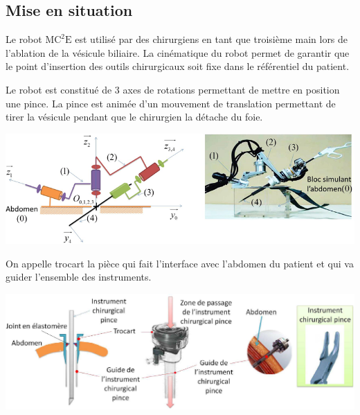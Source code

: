 \documentclass[10pt,fleqn]{article} %
\begin{document}

\vspace{4.5cm}
\pagestyle{fancy}
\thispagestyle{plain}


\def\columnseprulecolor{\color{ocre}}
\setlength{\columnseprule}{0.4pt} 


\begin{multicols}{2}
\section*{Mise en situation}
\ifprof
\else
Le robot $\text{MC}^2\text{E}$ est utilisé par des chirurgiens en tant que troisième main lors de l'ablation de la vésicule biliaire. La cinématique du robot permet de garantir que le point d'insertion des outils chirurgicaux soit fixe dans le référentiel du patient. 

Le robot est constitué de 3 axes de rotations permettant de mettre en position une pince. La pince est animée d'un mouvement de translation permettant de tirer la vésicule pendant que le chirurgien la détache du foie. 

\begin{center}
\includegraphics[width=\linewidth]{images/fig_02}
\end{center}

On appelle trocart la pièce qui fait l'interface avec l'abdomen du patient et qui va guider l'ensemble des instruments. 

\begin{center}
\includegraphics[width=\linewidth]{images/fig_09}
\end{center}



\end{multicols}
\end{document}
